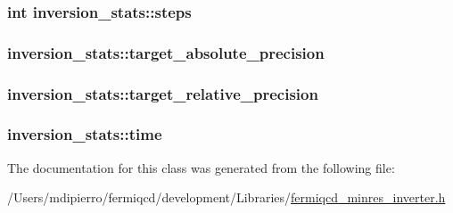\label{classinversion__stats_a6463ea546805e548502803d09c7b74f0}
\hypertarget{classinversion__stats_aabd17c3bb1476dc06843ed171ea53253}{
\subsubsection[{steps}]{\setlength{\rightskip}{0pt plus 5cm}int {\bf inversion\_\-stats::steps}}}
\label{classinversion__stats_aabd17c3bb1476dc06843ed171ea53253}
\hypertarget{classinversion__stats_aa3e398f27da37c39f825b407829e8c15}{
\subsubsection[{target\_\-absolute\_\-precision}]{ {\bf inversion\_\-stats::target\_\-absolute\_\-precision}}}
\label{classinversion__stats_aa3e398f27da37c39f825b407829e8c15}
\hypertarget{classinversion__stats_a57f0e5274f6057d41a9e386d2d3d213e}{
\subsubsection[{target\_\-relative\_\-precision}]{ {\bf inversion\_\-stats::target\_\-relative\_\-precision}}}
\label{classinversion__stats_a57f0e5274f6057d41a9e386d2d3d213e}
\hypertarget{classinversion__stats_a648a0c2aae15866e7331d0cd4d0736ff}{
\subsubsection[{time}]{ {\bf inversion\_\-stats::time}}}
\label{classinversion__stats_a648a0c2aae15866e7331d0cd4d0736ff}


The documentation for this class was generated from the following file:\begin{DoxyCompactItemize}
\item 
/Users/mdipierro/fermiqcd/development/Libraries/\hyperlink{fermiqcd__minres__inverter_8h}{fermiqcd\_\-minres\_\-inverter.h}\end{DoxyCompactItemize}
